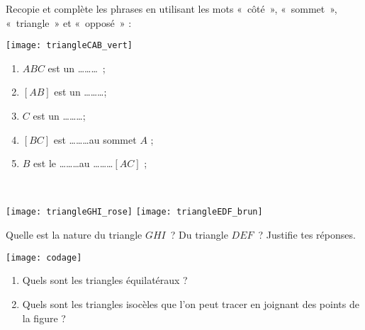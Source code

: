 

\begin{exercice}
Recopie et complète les phrases en utilisant les mots « côté », « sommet », « triangle » et « opposé » : \\[-3em]
\begin{minipage}[c]{0.26\linewidth}
 \vspace{1.5cm}
 \texttt{[image: triangleCAB\_vert]}
 \end{minipage} \hfill%
 \begin{minipage}[t]{0.68\linewidth}
  \begin{enumerate}
   \item $ABC$ est un \ldots \ldots \ldots ;
   \item $[AB]$ est un  \ldots \ldots\ldots ;
   \item $C$ est un  \ldots \ldots\ldots ;
   \item $[BC]$ est  \ldots \ldots \ldots au sommet $A$ ;
   \item $B$ est le  \ldots \ldots \ldots au  \ldots \ldots \ldots $[AC]$ ;
   \end{enumerate}
 \end{minipage} \\
\end{exercice}


\begin{exercice}
 \begin{center} \texttt{[image: triangleGHI\_rose]} \qquad \texttt{[image: triangleEDF\_brun]} \end{center}
 Quelle est la nature du triangle $GHI$ ? Du triangle $DEF$ ? Justifie tes réponses.
\end{exercice}

\begin{exercice}
\begin{center} \texttt{[image: codage]} \end{center}
\begin{enumerate}
 \item Quels sont les triangles équilatéraux ?
 \item Quels sont les triangles isocèles que l'on peut tracer en joignant des points de la figure ?
 \end{enumerate}
\end{exercice}

